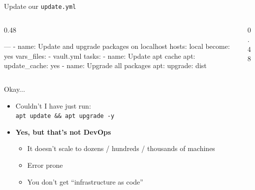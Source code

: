 \documentclass[aspectratio=169,12pt]{beamer}
\begin{document}
\begin{frame}[fragile]{Update our \texttt{update.yml}}
\begin{columns}[T]
\begin{column}{0.48\textwidth}
\begin{codeyaml}
---
- name: Update and upgrade packages
    on localhost
  hosts: local
  become: yes
  vars_files:    - vault.yml  tasks:
    - name: Update apt cache
      apt:
        update_cache: yes
    - name: Upgrade all packages
      apt:
        upgrade: dist
\end{codeyaml}
\end{column}
\begin{column}{0.48\textwidth}
\end{column}
\end{columns}
\end{frame}

\begin{frame}{Okay...}
\begin{itemize}
  \item Couldn't I have just run:\\[0.2cm]
    \texttt{apt update \&\& apt upgrade -y}
  \vspace{0.5cm}
  \item \textbf{Yes, but that's not DevOps}
  \begin{itemize}
    \item It doesn't scale to dozens / hundreds / thousands of machines
    \item Error prone
    \item You don't get ``infrastructure as code''
  \end{itemize}
\end{itemize}
\end{frame}
\end{document}
